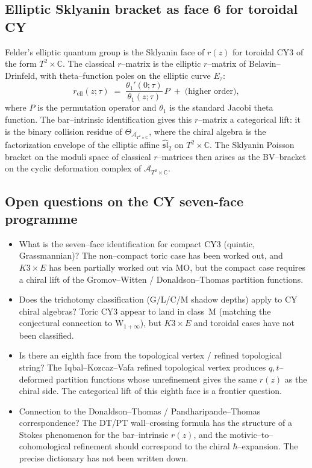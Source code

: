 \documentclass[11pt]{article}
\newcommand{\cA}{\mathcal{A}}
\newcommand{\C}{\mathbb{C}}
\begin{document}
\subsection{Elliptic Sklyanin bracket as face 6 for toroidal CY}

Felder's elliptic quantum group is the Sklyanin face of $r(z)$ for
toroidal CY3 of the form $T^2 \times \C$. The classical $r$--matrix is
the elliptic $r$--matrix of Belavin--Drinfeld, with theta--function poles
on the elliptic curve $E_\tau$:
\[
 r_{\mathrm{ell}}(z;\tau) \;=\; \frac{\theta_1'(0;\tau)}{\theta_1(z;\tau)}\,P
 \;+\; \text{(higher order)},
\]
where $P$ is the permutation operator and $\theta_1$ is the standard
Jacobi theta function. The bar--intrinsic identification gives this
$r$--matrix a categorical lift: it is the binary collision residue of
$\Theta_{\cA_{T^2 \times \C}}$, where the chiral algebra is the
factorization envelope of the elliptic affine $\widehat{\mathfrak{sl}}_2$
on $T^2 \times \C$. The Sklyanin Poisson bracket on the moduli space of
classical $r$--matrices then arises as the BV--bracket on the cyclic
deformation complex of $\cA_{T^2 \times \C}$.

\subsection{Open questions on the CY seven-face programme}
\begin{itemize}
\item What is the seven--face identification for compact CY3 (quintic,
 Grassmannian)? The non--compact toric case has been worked out, and
 $K3 \times E$ has been partially worked out via MO, but the compact
 case requires a chiral lift of the Gromov--Witten / Donaldson--Thomas
 partition functions.
\item Does the trichotomy classification (G/L/C/M shadow depths) apply to
 CY chiral algebras? Toric CY3 appear to land in class~M (matching the
 conjectural connection to W$_{1+\infty}$), but $K3 \times E$ and
 toroidal cases have not been classified.
\item Is there an eighth face from the topological vertex / refined
 topological string? The Iqbal--Kozcaz--Vafa refined topological vertex
 produces $q,t$--deformed partition functions whose unrefinement gives
 the same $r(z)$ as the chiral side. The categorical lift of this
 eighth face is a frontier question.
\item Connection to the Donaldson--Thomas / Pandharipande--Thomas
 correspondence? The DT/PT wall--crossing formula has the structure of
 a Stokes phenomenon for the bar--intrinsic $r(z)$, and the
 motivic--to--cohomological refinement should correspond to the chiral
 $\hbar$--expansion. The precise dictionary has not been written down.
\end{itemize}
\end{document}
